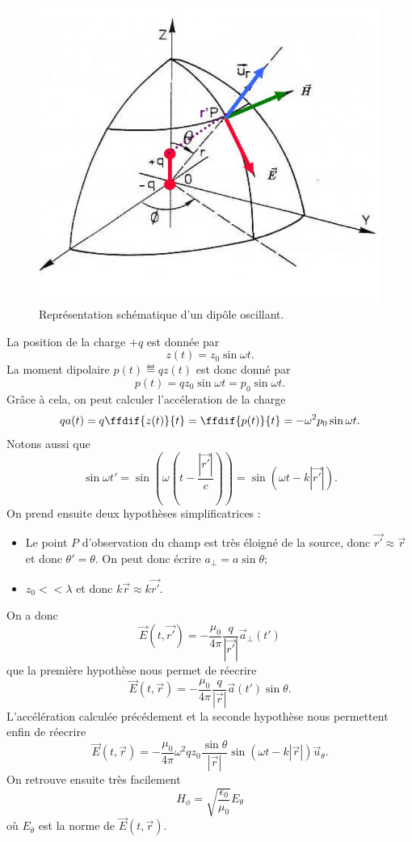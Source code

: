 \begin{figure}[ht]
	\centering
	\includegraphics[scale=0.8]{img/dipole.jpg}
	\caption{Représentation schématique d'un dipôle oscillant.}
	\label{fig:dipole}
\end{figure}

La position de la charge $+q$ est donnée par 
\[z(t) = z_0\sin\omega t.\]
La moment dipolaire $p(t) \eqdef qz(t)$ est
donc donné par
\[p(t) = qz_0 \sin\omega t = p_0\sin\omega t.\]
Grâce à cela, on peut calculer l'accéleration
de la charge 
\[qa(t) = q\ffdif{z(t)}{t} = \ffdif{p(t)}{t} = -\omega^2p_0\sin\omega t.\]
Notons aussi que
\[\sin\omega t' = \sin\left(\omega(t-\frac{|\vec{r'}|}{c})\right) = \sin(\omega t - k|\vec{r'}|).\]
On prend ensuite deux hypothèses simplificatrices :
\begin{itemize}
	\item Le point $P$ d'observation du champ est très éloigné
	de la source, donc $\vec{r'} \approx \vec{r}$ et donc $\theta' = \theta$.
	On peut donc écrire $a_\perp = a\sin\theta$; 
	\item $z_0 << \lambda$ et donc $k\vec{r} \approx k\vec{r'}$. 
\end{itemize}
On a donc
\[\vec{E}(t,\vec{r'}) = -\frac{\mu_0}{4\pi}\frac{q}{|\vec{r'}|}\vec{a}_\perp(t')\]
que la première hypothèse nous permet de réecrire
\[\vec{E}(t,\vec{r}) = -\frac{\mu_0}{4\pi}\frac{q}{|\vec{r}|}\vec{a}(t')\sin\theta.\]
L'accélération calculée précédement et la seconde hypothèse nous permettent enfin de réecrire
\[\vec{E}(t,\vec{r}) = -\frac{\mu_0}{4\pi}\omega^2qz_0\frac{\sin\theta}{|\vec{r}|}\sin(\omega t -k|\vec{r}|)\vec{u}_\theta.\]
On retrouve ensuite très facilement
\[H_\phi = \sqrt{\frac{\epsilon_0}{\mu_0}}E_\theta\]
où $E_\theta$ est la norme de $\vec{E}(t,\vec{r})$.

